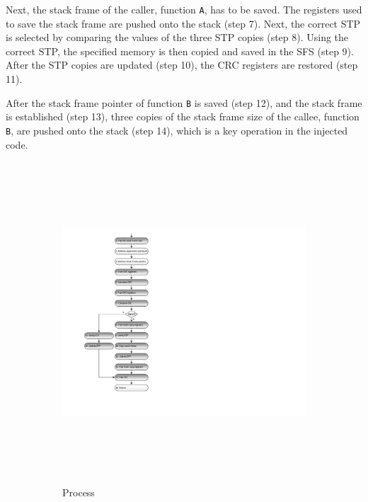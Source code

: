 Next, the stack frame of the caller, function \texttt{A}, has to be saved. The registers used to save the stack frame are pushed onto the stack (step 7). Next, the correct STP is selected by comparing the values of the three STP copies (step 8). Using the correct STP, the specified memory is then copied and saved in the SFS (step 9). After the STP copies are updated (step 10), the CRC registers are restored (step 11).

After the stack frame pointer of function \texttt{B} is saved (step 12), and the stack frame is established (step 13), three copies of the stack frame size of the callee, function \texttt{B}, are pushed onto the stack (step 14), which is a key operation in the injected code. 
\begin{figure}[h]
	\centering
	\begin{subfigure}[b]{0.5\columnwidth}
		\includegraphics[width=\textwidth, height=12cm]{figures/modified_function_operations_process_post_execution_v2}
		\caption{Process}
		\label{fig:modified_function_operation_process_post_execution}
	\end{subfigure}~
	\begin{subfigure}[b]{0.5\columnwidth}

\end{subfigure}
\end{figure}
